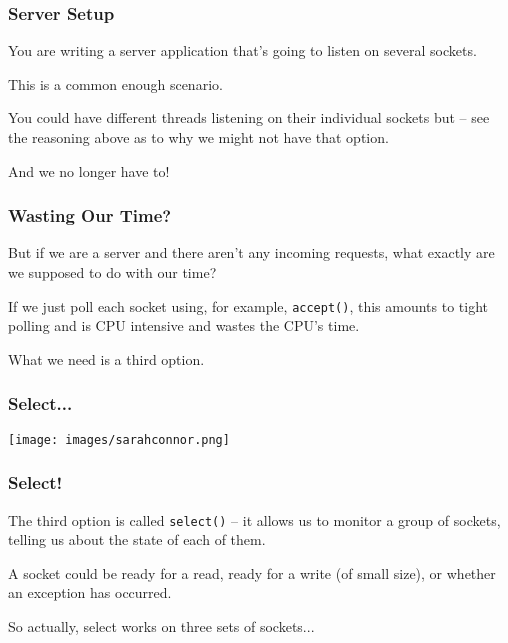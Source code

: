 \begin{frame}
	\frametitle{Server Setup}

	You are writing a server application that's going to listen on several sockets.

	This is a common enough scenario.

	You could have different threads listening on their individual sockets but -- see the reasoning above as to why we might not have that option.

	And we no longer have to!

\end{frame}


\begin{frame}
	\frametitle{Wasting Our Time?}

	But if we are a server and there aren't any incoming requests, what exactly are we supposed to do with our time?

	If we just poll each socket using, for example, \texttt{accept()}, this amounts to tight polling and is CPU intensive and wastes the CPU's time.

	What we need is a third option.
\end{frame}


\begin{frame}
	\frametitle{Select...}

	\begin{center}
		\texttt{[image: images/sarahconnor.png]}
	\end{center}

\end{frame}

\begin{frame}
	\frametitle{Select!}

	The third option is called \texttt{select()} -- it allows us to monitor a group of sockets, telling us about the state of each of them.

	A socket could be ready for a read, ready for a write (of small size), or whether an exception has occurred.

	So actually, select works on three sets of sockets...

\end{frame}

